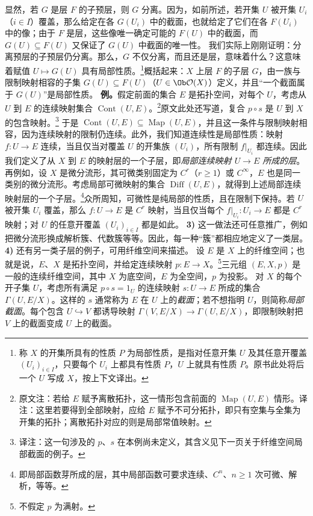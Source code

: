 显然，若 $G$ 是层 $F$ 的子预层，则 $G$ 分离。因为，如前所述，若开集 $U$ 被开集 $U_i$（$i\in I$）覆盖，那么给定在各 $G(U_i)$ 中的截面，也就给定了它们在各 $F(U_i)$ 中的像；由于 $F$ 是层，这些像唯一确定可能的 $F(U)$ 中的截面，而 $G(U)\subseteq F(U)$ 又保证了 $G(U)$ 中截面的唯一性。
我们实际上刚刚证明：分离预层的子预层仍分离。那么，$G$ 不仅分离，而且还是层，意味着什么？这意味着赋值 $U\mapsto G(U)$ 具有局部性质。\footnote{称 $X$ 的开集所具有的性质 $P$ 为局部性质，是指对任意开集 $U$ 及其任意开覆盖 $(U_i)_{i\in I}$，只要每个 $U_i$ 上都具有性质 $P$，$U$ 上就具有性质 $P$。原书此处将后一个 $U$ 写成 $X$，按上下文译出。}概括起来：$X$ 上层 $F$ 的子层 $G$，由一族与限制映射相容的子集 $G(U)\subseteq F(U)$（$U\in\Ob\mathcal O(X)$）定义，并且“一个截面属于 $G(U)$”是局部性质。
\textbf{例。}假定前面的集合 $E$ 是拓扑空间，对每个 $U$，考虑从 $U$ 到 $E$ 的连续映射集合 $\operatorname{Cont}(U,E)$。\footnote{原文注：若给 $E$ 赋予离散拓扑，这一情形包含前面的 $\operatorname{Map}(U,E)$ 情形。译注：这里若要得到全部映射，应给 $E$ 赋予不可分拓扑，即只有空集与全集为开集的拓扑；离散拓扑对应的则是局部常值映射。}原文此处还写道，复合 $p\circ s$ 是 $U$ 到 $X$ 的包含映射。\footnote{译注：这一句涉及的 $p$、$s$ 在本例尚未定义，其含义见下一页关于纤维空间局部截面的例子。}
于是 $\operatorname{Cont}(U,E)\subseteq\operatorname{Map}(U,E)$，并且这一条件与限制映射相容，因为连续映射的限制仍连续。此外，我们知道连续性是局部性质：映射 $f\colon U\to E$ 连续，当且仅当对覆盖 $U$ 的开集族 $(U_i)$，所有限制 $f|_{U_i}$ 都连续。因此我们定义了从 $X$ 到 $E$ 的映射层的一个子层，即\emph{局部连续映射 $U\to E$ 所成的层}。
再例如，设 $X$ 是微分流形，其可微类别固定为 $C^r$（$r\ge1$）或 $C^{\infty}$，$E$ 也是同一类别的微分流形。考虑局部可微映射的集合 $\operatorname{Diff}(U,E)$，就得到上述局部连续映射层的一个子层。\footnote{即局部函数芽所成的层，其中局部函数可要求连续、$C^n$、$n\ge1$ 次可微、解析，等等。}众所周知，可微性是纯局部的性质，且在限制下保持。若 $U$ 被开集 $U_i$ 覆盖，那么 $f\colon U\to E$ 是 $C^r$ 映射，当且仅当每个 $f|_{U_i}\colon U_i\to E$ 都是 $C^r$ 映射；对 $U$ 的任意开覆盖 $(U_i)_{i\in I}$ 都是如此。
\textbf{3)} 这一做法还可任意推广，例如把微分流形换成解析簇、代数簇等等。因此，每一种“簇”都相应地定义了一类层。
\textbf{4)} 还有另一类子层的例子，可用纤维空间来描述。
设 $E$ 是 $X$ 上的纤维空间；也就是说，$E$、$X$ 是拓扑空间，并给定连续映射 $p\colon E\to X$。\footnote{不假定 $p$ 为满射。}三元组 $(E,X,p)$ 是一般的连续纤维空间，其中 $X$ 为底空间，$E$ 为全空间，$p$ 为投影。
对 $X$ 的每个开子集 $U$，考虑所有满足 $p\circ s=1_U$ 的连续映射 $s\colon U\to E$ 所成的集合 $\Gamma(U,E/X)$。这样的 $s$ 通常称为 $E$ 在 $U$ 上的\emph{截面}；若不想指明 $U$，则简称\emph{局部截面}。每个包含 $U\hookrightarrow V$ 都诱导映射 $\Gamma(V,E/X)\to\Gamma(U,E/X)$，即限制映射把 $V$ 上的截面变成 $U$ 上的截面。
